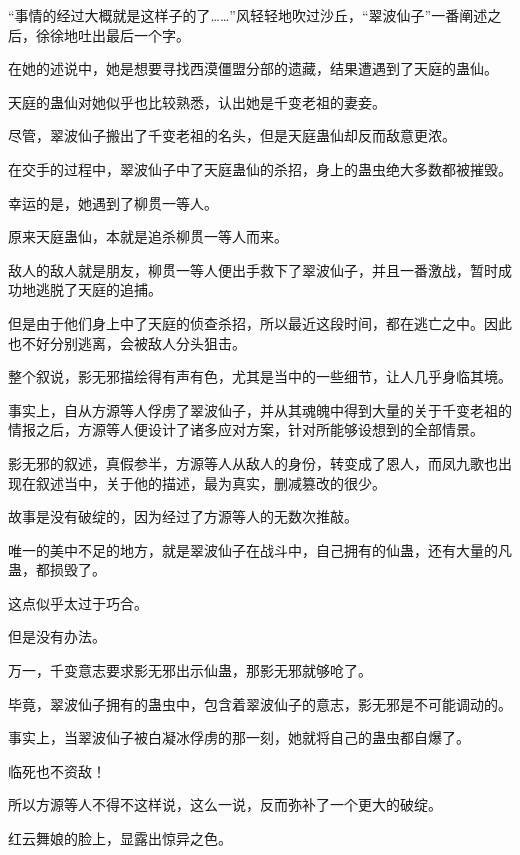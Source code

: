 
\begin{this_body}

“事情的经过大概就是这样子的了……”风轻轻地吹过沙丘，“翠波仙子”一番阐述之后，徐徐地吐出最后一个字。

在她的述说中，她是想要寻找西漠僵盟分部的遗藏，结果遭遇到了天庭的蛊仙。

天庭的蛊仙对她似乎也比较熟悉，认出她是千变老祖的妻妾。

尽管，翠波仙子搬出了千变老祖的名头，但是天庭蛊仙却反而敌意更浓。

在交手的过程中，翠波仙子中了天庭蛊仙的杀招，身上的蛊虫绝大多数都被摧毁。

幸运的是，她遇到了柳贯一等人。

原来天庭蛊仙，本就是追杀柳贯一等人而来。

敌人的敌人就是朋友，柳贯一等人便出手救下了翠波仙子，并且一番激战，暂时成功地逃脱了天庭的追捕。

但是由于他们身上中了天庭的侦查杀招，所以最近这段时间，都在逃亡之中。因此也不好分别逃离，会被敌人分头狙击。

整个叙说，影无邪描绘得有声有色，尤其是当中的一些细节，让人几乎身临其境。

事实上，自从方源等人俘虏了翠波仙子，并从其魂魄中得到大量的关于千变老祖的情报之后，方源等人便设计了诸多应对方案，针对所能够设想到的全部情景。

影无邪的叙述，真假参半，方源等人从敌人的身份，转变成了恩人，而凤九歌也出现在叙述当中，关于他的描述，最为真实，删减篡改的很少。

故事是没有破绽的，因为经过了方源等人的无数次推敲。

唯一的美中不足的地方，就是翠波仙子在战斗中，自己拥有的仙蛊，还有大量的凡蛊，都损毁了。

这点似乎太过于巧合。

但是没有办法。

万一，千变意志要求影无邪出示仙蛊，那影无邪就够呛了。

毕竟，翠波仙子拥有的蛊虫中，包含着翠波仙子的意志，影无邪是不可能调动的。

事实上，当翠波仙子被白凝冰俘虏的那一刻，她就将自己的蛊虫都自爆了。

临死也不资敌！

所以方源等人不得不这样说，这么一说，反而弥补了一个更大的破绽。

红云舞娘的脸上，显露出惊异之色。


\end{this_body}
